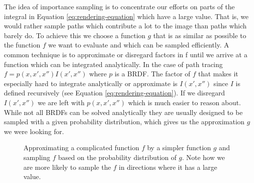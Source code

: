 \documentclass{ACGSeminar}
\begin{document}
The idea of importance sampling is to concentrate our efforts on parts of the integral in Equation \eqref{eq:rendering-equation} which have a large value. That is, we would rather sample paths which contribute a lot to the image than paths which barely do. To achieve this we choose a function $g$ that is as similar as possible to the function $f$ we want to evaluate and which can be sampled efficiently. A common technique is to approximate or disregard factors in f until we arrive at a function which can be integrated analytically. In the case of path tracing $f = p(x,x',x'')I(x',x'')$ where $p$ is a BRDF. The factor of $f$ that makes it especially hard to integrate analytically or approximate is $I(x',x'')$ since $I$ is defined recursively (see Equation \eqref{eq:rendering-equation}). If we disregard $I(x',x'')$ we are left with $p(x,x',x'')$ which is much easier to reason about. While not all BRDFs can be solved analytically \cite{Montes2012} they are usually designed to be sampled with a given probability distribution, which gives us the approximation $g$ we were looking for. 

\begin{figure}[htb!]
  \begin{centering}
  \par
  \end{centering}
  \caption{Approximating a complicated function $f$ by a simpler function $g$ and sampling $f$ based on the probability distribution of $g$. Note how we are more likely to sample the $f$ in directions where it has a large value.\protect\footnotemark}
  \label{fig:importance-sampling}
\end{figure}
\end{document}
